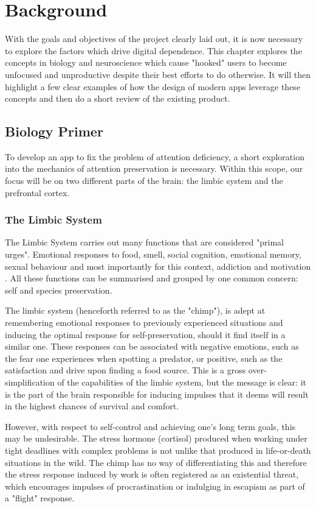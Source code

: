 \chapter{Background}
\label{ch:background}
With the goals and objectives of the project clearly laid out, it is now necessary to explore the factors which drive digital dependence. This chapter explores the concepts in biology and neuroscience which cause "hooked" users to become unfocused and unproductive despite their best efforts to do otherwise. It will then highlight a few clear examples of how the design of modern apps leverage these concepts and then do a short review of the existing product.

\section{Biology Primer}
To develop an app to fix the problem of attention deficiency, a short exploration into the mechanics of attention preservation is necessary.
Within this scope, our focus will be on two different parts of the brain: the limbic system and the prefrontal cortex.

\subsection{The Limbic System}
The Limbic System carries out many functions that are considered "primal urges". Emotional responses to food, smell, social cognition, emotional memory, sexual behaviour and most importantly for this context, addiction and motivation \cite{rajmohan2007limbic}. All these functions can be summarised and grouped by one common concern: self and species preservation.

The limbic system (henceforth referred to as the "chimp"), is adept at remembering emotional responses to previously experienced situations and inducing the optimal response for self-preservation, should it find itself in a similar one. These responses can be associated with negative emotions, such as the fear one experiences when spotting a predator, or positive, such as the satisfaction and drive upon finding a food source. This is a gross over-simplification of the capabilities of the limbic system, but the message is clear: it is the part of the brain responsible for inducing impulses that it deems will result in the highest chances of survival and comfort.

However, with respect to self-control and achieving one's long term goals, this may be undesirable. The stress hormone (cortisol) produced when working under tight deadlines with complex problems is not unlike that produced in life-or-death situations in the wild. The chimp has no way of differentiating this and therefore the stress response induced by work is often registered as an existential threat, which encourages impulses of procrastination or indulging in escapism as part of a "flight" response.

